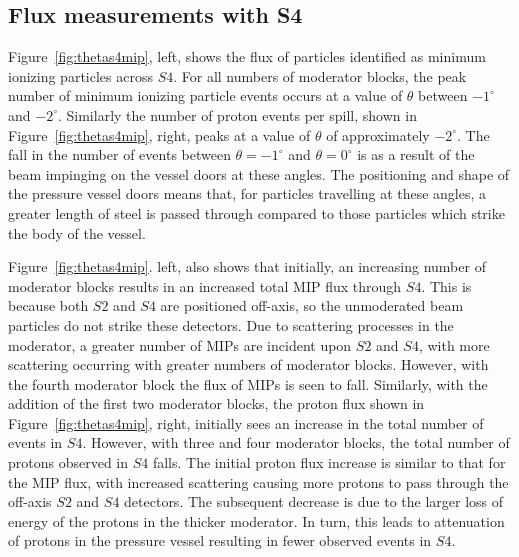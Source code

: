 \subsection{Flux measurements with S4}
\label{sec:s4Flux}

Figure~\ref{fig:thetas4mip}, left, shows the flux of particles identified as minimum ionizing particles across $\mathit{S4}$.
For all numbers of moderator blocks, the peak number of minimum ionizing particle events occurs at a value of $\theta$ between $-1^{\circ}$ and $-2^{\circ}$.
Similarly the number of proton events per spill, shown in Figure~\ref{fig:thetas4mip}, right, peaks at a value of $\theta$ of approximately $-2^{\circ}$.
The fall in the number of events between $\theta = -1^{\circ}$ and $\theta = 0^{\circ}$ is as a result of the beam impinging on the vessel doors at these angles.
The positioning and shape of the pressure vessel doors means that, for particles travelling at these angles, a greater length of steel is passed through compared to those particles which strike the body of the vessel.


Figure~\ref{fig:thetas4mip}. left, also shows that initially, an increasing number of moderator blocks results in an increased total MIP flux through $\mathit{S4}$. 
This is because both $\mathit{S2}$ and $\mathit{S4}$ are positioned off-axis, so the unmoderated beam particles do not strike these detectors.
Due to scattering processes in the moderator, a greater number of MIPs are incident upon $\mathit{S2}$ and $\mathit{S4}$, with more scattering occurring with greater numbers of moderator blocks.
However, with the fourth moderator block the flux of MIPs is seen to fall.
Similarly, with the addition of the first two moderator blocks, the proton flux shown in Figure~\ref{fig:thetas4mip}, right, initially sees an increase in the total number of events in $\mathit{S4}$.
However, with three and four moderator blocks, the total number of protons observed in $\mathit{S4}$ falls.
The initial proton flux increase is similar to that for the MIP flux, with increased scattering causing more protons to pass through the off-axis $\mathit{S2}$ and $\mathit{S4}$ detectors.
The subsequent decrease is due to the larger loss of energy of the protons in the thicker moderator.
In turn, this leads to attenuation of protons in the pressure vessel resulting in fewer observed events in $\mathit{S4}$.

